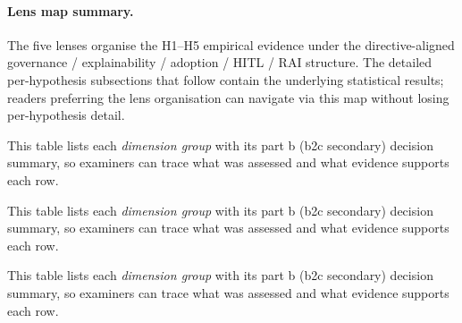 \paragraph{Lens map summary.} The five lenses organise the H1--H5 empirical evidence under the directive-aligned governance / explainability / adoption / HITL / RAI structure. The detailed per-hypothesis subsections that follow contain the underlying statistical results; readers preferring the lens organisation can navigate via this map without losing per-hypothesis detail.

\noindent This table lists each \textit{dimension group} with its part b (b2c secondary) decision summary, so examiners can trace what was assessed and what evidence supports each row.



\noindent This table lists each \textit{dimension group} with its part b (b2c secondary) decision summary, so examiners can trace what was assessed and what evidence supports each row.


\noindent This table lists each \textit{dimension group} with its part b (b2c secondary) decision summary, so examiners can trace what was assessed and what evidence supports each row.




